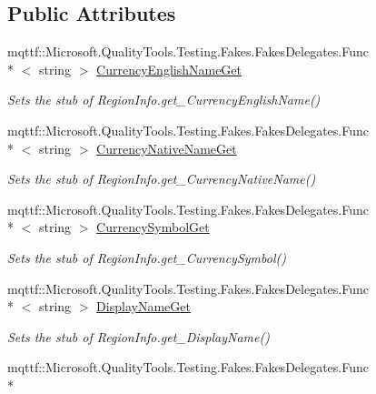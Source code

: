 \subsection*{Public Attributes}
\begin{DoxyCompactItemize}
\item 
mqttf\-::\-Microsoft.\-Quality\-Tools.\-Testing.\-Fakes.\-Fakes\-Delegates.\-Func\\*
$<$ string $>$ \hyperlink{class_system_1_1_globalization_1_1_fakes_1_1_stub_region_info_a936a45d74fbc2a2ae27f3d664974e441}{Currency\-English\-Name\-Get}
\begin{DoxyCompactList}\small\item\em Sets the stub of Region\-Info.\-get\-\_\-\-Currency\-English\-Name()\end{DoxyCompactList}\item 
mqttf\-::\-Microsoft.\-Quality\-Tools.\-Testing.\-Fakes.\-Fakes\-Delegates.\-Func\\*
$<$ string $>$ \hyperlink{class_system_1_1_globalization_1_1_fakes_1_1_stub_region_info_a19e56070e4a3c5fe1eeb3fd7a34a24f9}{Currency\-Native\-Name\-Get}
\begin{DoxyCompactList}\small\item\em Sets the stub of Region\-Info.\-get\-\_\-\-Currency\-Native\-Name()\end{DoxyCompactList}\item 
mqttf\-::\-Microsoft.\-Quality\-Tools.\-Testing.\-Fakes.\-Fakes\-Delegates.\-Func\\*
$<$ string $>$ \hyperlink{class_system_1_1_globalization_1_1_fakes_1_1_stub_region_info_aec277298a0c9dd139a9b77e2b1cd60ef}{Currency\-Symbol\-Get}
\begin{DoxyCompactList}\small\item\em Sets the stub of Region\-Info.\-get\-\_\-\-Currency\-Symbol()\end{DoxyCompactList}\item 
mqttf\-::\-Microsoft.\-Quality\-Tools.\-Testing.\-Fakes.\-Fakes\-Delegates.\-Func\\*
$<$ string $>$ \hyperlink{class_system_1_1_globalization_1_1_fakes_1_1_stub_region_info_a390c36a4c1324f08f226521401fcaa7d}{Display\-Name\-Get}
\begin{DoxyCompactList}\small\item\em Sets the stub of Region\-Info.\-get\-\_\-\-Display\-Name()\end{DoxyCompactList}\item 
mqttf\-::\-Microsoft.\-Quality\-Tools.\-Testing.\-Fakes.\-Fakes\-Delegates.\-Func\\*

\end{DoxyCompactItemize}
